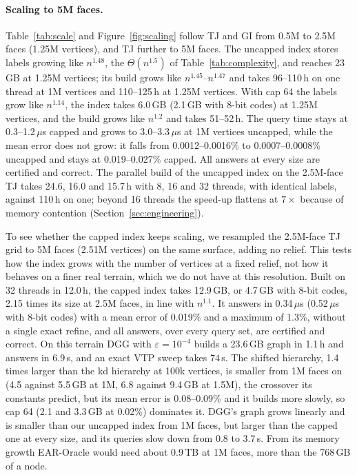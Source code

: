 \documentclass[sigconf,nonacm,screen]{acmart}
\newcommand{\eps}{\varepsilon}
\begin{document}
\paragraph{Scaling to 5M faces.}
Table~\ref{tab:scale} and Figure~\ref{fig:scaling} follow TJ and GI from 0.5M to 2.5M faces (1.25M vertices), and TJ
further to 5M faces. The uncapped index stores labels growing like $n^{1.48}$, the $\Theta(n^{1.5})$ of
Table~\ref{tab:complexity}, and reaches 23\,GB at 1.25M vertices; its build grows like $n^{1.45}$--$n^{1.47}$ and takes 96--110\,h
on one thread at 1M vertices and 110--125\,h at 1.25M vertices. With cap 64 the labels grow like $n^{1.14}$, the
index takes 6.0\,GB (2.1\,GB with 8-bit codes) at 1.25M vertices, and the build grows like $n^{1.2}$ and
takes 51--52\,h. The query time stays at 0.3--1.2\,$\mu$s capped and grows to 3.0--3.3\,$\mu$s at 1M vertices
uncapped, while the mean error does not grow: it falls from 0.0012--0.0016\% to 0.0007--0.0008\% uncapped and stays
at 0.019--0.027\% capped. All answers at every size are certified and correct. The parallel build of the uncapped
index on the 2.5M-face TJ takes 24.6, 16.0 and 15.7\,h with 8, 16 and 32 threads, with identical labels, against
110\,h on one; beyond 16 threads the speed-up flattens at $7\times$ because of memory contention
(Section~\ref{sec:engineering}).

To see whether the capped index keeps scaling, we resampled the 2.5M-face TJ grid to 5M faces (2.51M vertices) on
the same surface, adding no relief. This tests how the index grows with the number of vertices at a fixed relief,
not how it behaves on a finer real terrain, which we do not have at this resolution. Built on 32 threads in 12.0\,h, the capped index takes 12.9\,GB, or 4.7\,GB with
8-bit codes, 2.15 times its size at 2.5M faces, in line with $n^{1.1}$. It answers in 0.34\,$\mu$s (0.52\,$\mu$s
with 8-bit codes) with a mean error of 0.019\% and a maximum of 1.3\%, without a single exact refine, and all
answers, over every query set, are certified and correct. On this terrain DGG with $\eps=10^{-4}$ builds a 23.6\,GB
graph in 1.1\,h and answers in 6.9\,s, and an exact VTP sweep takes 74\,s. The shifted hierarchy, 1.4 times larger than the kd
hierarchy at 100k vertices, is smaller from 1M faces on (4.5 against 5.5\,GB at 1M, 6.8 against 9.4\,GB at 1.5M),
the crossover its constants predict, but its mean error is 0.08--0.09\% and it builds more slowly, so cap 64
(2.1 and 3.3\,GB at 0.02\%) dominates it. DGG's graph grows linearly and is smaller than our uncapped index from 1M faces, but larger than
the capped one at every size, and its queries slow down from 0.8 to 3.7\,s. From its memory growth EAR-Oracle would need about
0.9\,TB at 1M faces, more than the 768\,GB of a node.
\end{document}

